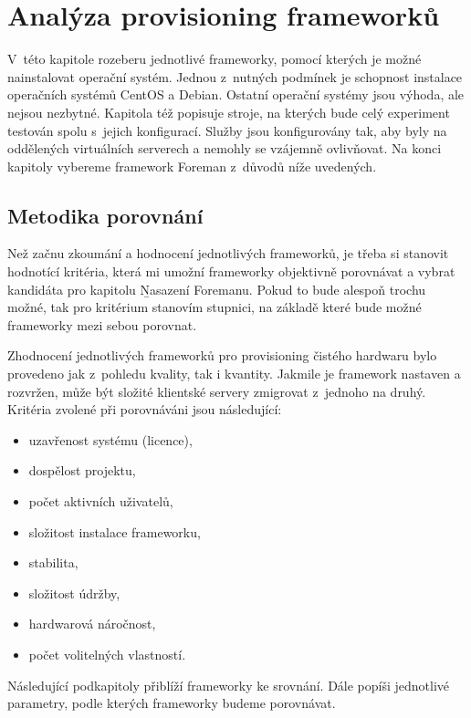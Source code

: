 
\chapter{Analýza provisioning frameworků}

V~této kapitole rozeberu jednotlivé frameworky, pomocí kterých je možné nainstalovat operační systém. Jednou z~nutných podmínek je schopnost instalace operačních systémů CentOS a Debian. Ostatní operační systémy jsou výhoda, ale nejsou nezbytné. Kapitola též popisuje stroje, na kterých bude celý experiment testován spolu s~jejich konfigurací. Služby jsou konfigurovány tak, aby byly na oddělených virtuálních serverech a nemohly se vzájemně ovlivňovat. Na konci kapitoly vybereme framework Foreman z~důvodů níže uvedených.

\section{Metodika porovnání}

Než začnu zkoumání a hodnocení jednotlivých frameworků, je třeba si stanovit hodnotící kritéria, která mi umožní frameworky objektivně porovnávat a vybrat kandidáta pro kapitolu \b{Nasazení Foremanu}. Pokud to bude alespoň trochu možné, tak pro kritérium stanovím stupnici, na základě které bude možné frameworky mezi sebou porovnat.


Zhodnocení jednotlivých frameworků pro provisioning čistého hardwaru bylo provedeno jak z~pohledu kvality, tak i kvantity. Jakmile je framework nastaven a rozvržen, může být složité klientské servery zmigrovat z~jednoho na druhý. Kritéria zvolené při porovnáváni jsou následující:


\begin{itemize}
\item uzavřenost systému (licence),
\item dospělost projektu,
\item počet aktivních uživatelů,
\item složitost instalace frameworku,
\item stabilita,
\item složitost údržby,
\item hardwarová náročnost,
\item počet volitelných vlastností.
\end{itemize}

Následující podkapitoly přiblíží frameworky ke srovnání. Dále popíši jednotlivé parametry, podle kterých frameworky budeme porovnávat.



